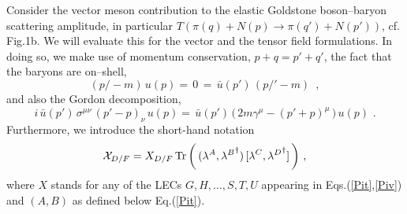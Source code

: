 Consider the vector meson contribution to the elastic Goldstone boson--baryon
scattering amplitude, in particular  $T( \pi(q) + N(p) \to \pi(q') +
N(p') )$, cf. Fig.1b. We will evaluate this for the vector and the
tensor field formulations. In doing so, we make use of momentum
conservation, $p+q = p' + q'$, the fact that the baryons are
on--shell,
\begin{equation}
( p\!\!\!/ -m) \,u(p) = \, 0 \,=  \,
\bar{u}(p') \,  ( p\!\!\!/ ' -m) \, \, \, ,
\end{equation}
and also the Gordon decomposition,
\begin{equation}
i \, \bar{u}(p') \,  \sigma^{\mu \nu} \, ( p' -p)_\nu \, u(p) =
\, \bar{u}(p') \,  \bigl( \,2 m \gamma^\mu  - ( p' +p)^\mu \,\bigr) \, u(p)
\, \, .
\end{equation}
Furthermore, we introduce the short-hand notation
\begin{equation}
{\cal X}_{D/F} = X_{D/F} \, {\rm Tr} \,
\biggl( \, ( \lambda^A , {\lambda^B}^\dagger
) \, [ \lambda^C , {\lambda^D}^\dagger ] \, \biggr) \, \, ,
\label{nota}
\end{equation}
where $X$ stands for any of the LECs $G,H, \ldots ,S,T,U$
appearing in Eqs.(\ref{Pit},\ref{Piv}) and $(A,B)$ as defined
below Eq.(\ref{Pit}).

